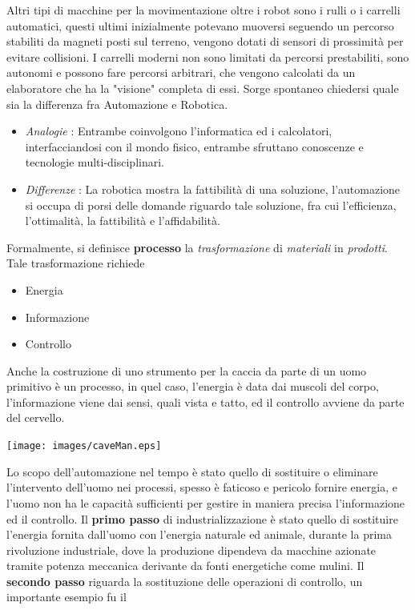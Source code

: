 \documentclass[10pt, letterpaper]{report}
\begin{document}
Altri tipi di macchine per la movimentazione oltre i robot sono i rulli o i carrelli automatici, questi ultimi 
inizialmente potevano muoversi seguendo un percorso stabiliti da magneti posti sul terreno, vengono dotati di 
sensori di prossimità per evitare collisioni. I carrelli moderni non sono limitati da percorsi prestabiliti, sono 
autonomi e possono fare percorsi arbitrari, che vengono calcolati da un elaboratore che ha la "visione" completa 
di essi.\acc 
Sorge spontaneo chiedersi quale sia la differenza fra Automazione e Robotica.\begin{itemize}
    \item \textit{Analogie} : Entrambe coinvolgono l'informatica ed i calcolatori, interfacciandosi con il mondo 
    fisico, entrambe sfruttano conoscenze e tecnologie multi-disciplinari. 
    \item \textit{Differenze} : La robotica mostra la fattibilità di una soluzione, l'automazione si occupa di 
    porsi delle domande riguardo tale soluzione, fra cui l'efficienza, l'ottimalità, la fattibilità e l'affidabilità.
\end{itemize}
Formalmente, si definisce \textbf{processo} la \textit{trasformazione} di \textit{materiali} in 
\textit{prodotti}. Tale trasformazione richiede 
\begin{itemize}
    \item Energia 
    \item Informazione 
    \item Controllo
\end{itemize}
Anche la costruzione di uno strumento per la caccia da parte di un uomo primitivo è un processo, in quel caso, 
l'energia è data dai muscoli del corpo, l'informazione viene dai sensi, quali vista e tatto, ed il controllo 
avviene da parte del cervello.
\begin{center}
    \texttt{[image: images/caveMan.eps]}
\end{center}
Lo scopo dell'automazione nel tempo è stato quello di sostituire o eliminare l'intervento dell'uomo 
nei processi, spesso è faticoso e pericolo fornire energia, e l'uomo non ha le capacità sufficienti per 
gestire in maniera precisa l'informazione ed il controllo.\acc 
Il \textbf{primo passo} di industrializzazione è stato quello di sostituire l'energia fornita dall'uomo con l'energia 
naturale ed animale, durante la prima rivoluzione industriale, dove la produzione dipendeva da macchine 
azionate tramite potenza meccanica derivante da fonti energetiche come mulini.\acc 
Il \textbf{secondo passo} riguarda la sostituzione delle operazioni di controllo, un importante esempio fu il 
\end{document}
